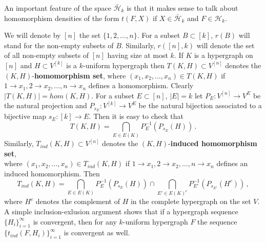 \documentclass [11pt] {article}
\def\to{\rightarrow}
\begin{document}
An important feature of the space $\bar{\mathcal{H}}_k$ is that it makes sense
to talk about homomorphism densities of the form $t(F,X)$
if $X\in\bar{\mathcal{H}}_k$ and $F\in\mathcal{H}_k$.

We will denote by $[n]$ the set $\{1,2,\dots,n\}$.
For a subset $B\subset [k]$, $r(B)$ will stand for the non-empty subsets of
$B$. Similarly, $r([n],k)$ will denote the set of all non-empty subsets
of $[n]$ having size at most $k$.
If $K$ is a hypergraph on $[n]$ and $H\subset V^{[k]}$ is a $k$-uniform
hypergraph then
$T(K,H)\subset V^{[n]}$ denotes
the $(K,H)$-{\bf homomorphism set}, where
$(x_1,x_2,\dots,x_n)\in T(K,H)$ if
$1\to x_1, 2\to x_2,\dots, n\to x_n$ defines a homomorphism.
Clearly $|T(K,H)|=hom(K,H)$. For a subset $E\subset [n]$, $|E|=k$
let $P_E:V^{[n]}\to V^{E}$ be the natural projection and
$P_{s_E}:V^{[k]}\to V^{E}$ be the natural bijection associated to a bijective
map $s_E:[k]\to E$.
Then it is easy to check that
$$T(K,H)=\bigcap_{E\in E(K)} P_E^{-1}\left(P_{s_E} (H)\right)\,.$$
Similarly, $T_{ind}(K,H)\subset V^{[n]}$ denotes
the $(K,H)$-{\bf induced homomorphism set}, \\ where
$(x_1,x_2,\dots,x_n)\in T_{ind}(K,H)$ if
$1\to x_1, 2\to x_2,\dots, n\to x_n$ defines an induced homomorphism. Then
$$T_{ind}(K,H)=\bigcap_{E\in E(K)} P_E^{-1}\left(P_{s_E} (H)\right)
\cap \bigcap_{E'\in E(K)^c} P_{E'}^{-1}\left(P_{s_{E'}} (H^c)\right)\,,$$
where $H^c$ denotes the complement of $H$
in the complete hypergraph on the set $V$. 
A simple inclusion-exlusion argument shows that if a hypergraph sequence
$\{H_i\}^\infty_{i=1}$ is convergent, then for any $k$-uniform hypergraph $F$
the sequence $\{t_{ind}(F,H_i)\}^\infty_{i=1}$ is convergent as well.
\end{document}
